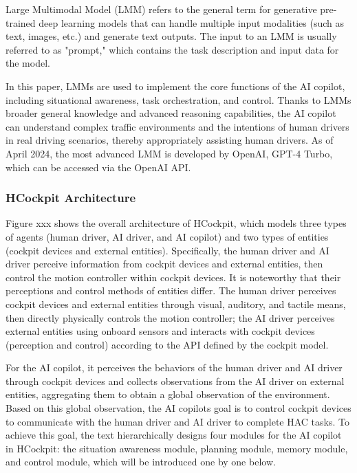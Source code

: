 \documentclass[
]{article}
\begin{document}
Large Multimodal Model (LMM) refers to the general term for generative
pre-trained deep learning models that can handle multiple input
modalities (such as text, images, etc.) and generate text outputs. The
input to an LMM is usually referred to as "prompt," which contains the
task description and input data for the model.

In this paper, LMMs are used to implement the core functions of the AI
copilot, including situational awareness, task orchestration, and
control. Thanks to LMM\textquotesingle s broader general knowledge and
advanced reasoning capabilities, the AI copilot can understand complex
traffic environments and the intentions of human drivers in real driving
scenarios, thereby appropriately assisting human drivers. As of April
2024, the most advanced LMM is developed by OpenAI, GPT-4 Turbo, which
can be accessed via the OpenAI API.

\subsubsection{HCockpit Architecture}\label{hcockpit-architecture}

Figure xxx shows the overall architecture of HCockpit, which models
three types of agents (human driver, AI driver, and AI copilot) and two
types of entities (cockpit devices and external entities). Specifically,
the human driver and AI driver perceive information from cockpit devices
and external entities, then control the motion controller within cockpit
devices. It is noteworthy that their perceptions and control methods of
entities differ. The human driver perceives cockpit devices and external
entities through visual, auditory, and tactile means, then directly
physically controls the motion controller; the AI driver perceives
external entities using onboard sensors and interacts with cockpit
devices (perception and control) according to the API defined by the
cockpit model.

For the AI copilot, it perceives the behaviors of the human driver and
AI driver through cockpit devices and collects observations from the AI
driver on external entities, aggregating them to obtain a global
observation of the environment. Based on this global observation, the AI
copilot\textquotesingle s goal is to control cockpit devices to
communicate with the human driver and AI driver to complete HAC tasks.
To achieve this goal, the text hierarchically designs four modules for
the AI copilot in HCockpit: the situation awareness module, planning
module, memory module, and control module, which will be introduced one
by one below.
\end{document}
